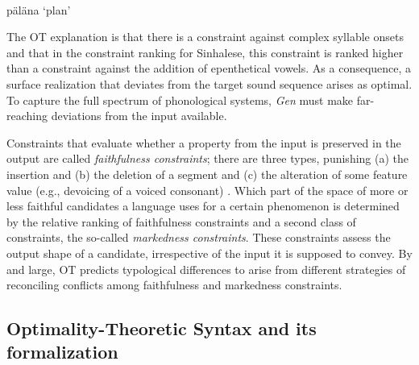 \documentclass[output=paper,hidelinks]{langscibook}
\begin{document}
\ea
\label{ex:plan}
\\
p\"al\"ana 
\glt `plan'
\z

\noindent
The OT explanation is that there is a constraint against complex syllable onsets and that in the constraint ranking for Sinhalese, this constraint is ranked higher than a constraint against the addition of epenthetical vowels. As a consequence, a surface realization that deviates from the target sound sequence arises as optimal. To capture the full spectrum of phonological systems, \emph{Gen} must make far-reaching deviations from the input available. 

Constraints that evaluate whether a property from the input is preserved in the output are called \emph{faithfulness constraints}; there are three types, punishing (a) the insertion and (b) the deletion of a segment and (c) the alteration of some feature value (e.g., devoicing of a voiced consonant) \citep{PrinceSmolensky1993,McCarthyPrince1993-faith}.
Which part of the space of more or less faithful candidates a language uses for a certain phenomenon is determined by the relative ranking of faithfulness constraints and a second class of constraints, the so-called \emph{markedness constraints}. These constraints assess the output shape of a candidate, irrespective of the input it is supposed to convey. By and large, OT predicts typological differences to arise from different strategies of reconciling conflicts among faithfulness and markedness constraints.




\subsection{Optimality-Theoretic Syntax and its formalization}
\label{sec:OT:OT-Syntax}
\end{document}

